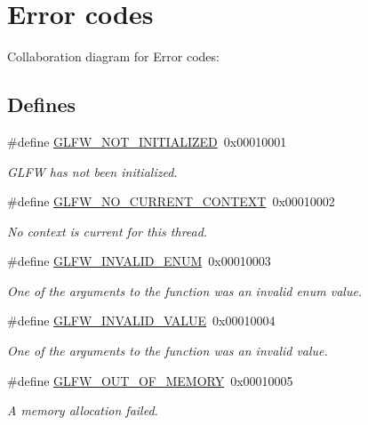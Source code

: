 \hypertarget{group__errors}{
\section{Error codes}
\label{group__errors}
}


Collaboration diagram for Error codes:\subsection*{Defines}
\begin{CompactItemize}
\item 
\#define \hyperlink{group__errors_g2374ee02c177f12e1fa76ff3ed15e14a}{GLFW\_\-NOT\_\-INITIALIZED}~0x00010001
\begin{CompactList}\small\item\em GLFW has not been initialized. \item\end{CompactList}\item 
\#define \hyperlink{group__errors_ga8290386e9528ccb9e42a3a4e16fc0d0}{GLFW\_\-NO\_\-CURRENT\_\-CONTEXT}~0x00010002
\begin{CompactList}\small\item\em No context is current for this thread. \item\end{CompactList}\item 
\#define \hyperlink{group__errors_g76f6bb9c4eea73db675f096b404593ce}{GLFW\_\-INVALID\_\-ENUM}~0x00010003
\begin{CompactList}\small\item\em One of the arguments to the function was an invalid enum value. \item\end{CompactList}\item 
\#define \hyperlink{group__errors_gaf2ef9aa8202c2b82ac2d921e554c687}{GLFW\_\-INVALID\_\-VALUE}~0x00010004
\begin{CompactList}\small\item\em One of the arguments to the function was an invalid value. \item\end{CompactList}\item 
\#define \hyperlink{group__errors_g9023953a2bcb98c2906afd071d21ee7f}{GLFW\_\-OUT\_\-OF\_\-MEMORY}~0x00010005
\begin{CompactList}\small\item\em A memory allocation failed. \item\end{CompactList}\item 

\end{CompactItemize}
